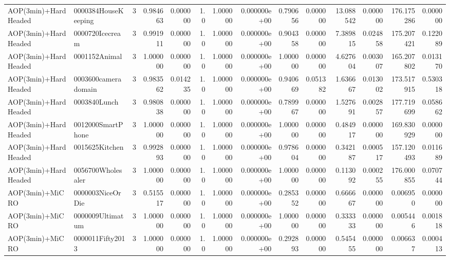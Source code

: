 \begin{tabular}{llrr|r|rr|rr|rr|rrr}
     AOP(3min)+HardHeaded &    0000384HouseKeeping &       3 & 0.984663 & 0.000000 &  1.0 &      1.000000 & 0.000000e+00 &      0.790656 & 0.000000 &     13.088542 &    0.000000 &   176.175286 &    0.000000 \\
     AOP(3min)+HardHeaded &        0000720Icecream &       3 & 0.991911 & 0.000000 &  1.0 &      1.000000 & 0.000000e+00 &      0.904358 & 0.000000 &      7.389815 &    0.024858 &   175.207421 &    0.122089 \\
     AOP(3min)+HardHeaded &          0001152Animal &       3 & 1.000000 & 0.000000 &  1.0 &      1.000000 & 0.000000e+00 &      1.000000 & 0.000000 &      4.627604 &    0.003007 &   165.207802 &    0.013170 \\
     AOP(3min)+HardHeaded &    0003600cameradomain &       3 & 0.983562 & 0.014235 &  1.0 &      1.000000 & 0.000000e+00 &      0.940669 & 0.051382 &      1.636667 &    0.013002 &   173.517915 &    0.530318 \\
     AOP(3min)+HardHeaded &           0003840Lunch &       3 & 0.980838 & 0.000000 &  1.0 &      1.000000 & 0.000000e+00 &      0.789967 & 0.000000 &      1.527691 &    0.002857 &   177.719699 &    0.058662 \\
     AOP(3min)+HardHeaded &      0012000SmartPhone &       3 & 1.000000 & 0.000000 &  1.0 &      1.000000 & 0.000000e+00 &      1.000000 & 0.000000 &      0.484917 &    0.000000 &   169.830929 &    0.000000 \\
     AOP(3min)+HardHeaded &         0015625Kitchen &       3 & 0.992893 & 0.000000 &  1.0 &      1.000000 & 0.000000e+00 &      0.978604 & 0.000000 &      0.342187 &    0.000517 &   157.120493 &    0.011689 \\
     AOP(3min)+HardHeaded &      0056700Wholesaler &       3 & 1.000000 & 0.000000 &  1.0 &      1.000000 & 0.000000e+00 &      1.000000 & 0.000000 &      0.113092 &    0.000255 &   176.000855 &    0.070744 \\
          AOP(3min)+MiCRO &       0000003NiceOrDie &       3 & 0.515517 & 0.000000 &  1.0 &      1.000000 & 0.000000e+00 &      0.285352 & 0.000000 &      0.666667 &    0.000000 &     0.006950 &    0.000000 \\
          AOP(3min)+MiCRO &       0000009Ultimatum &       3 & 1.000000 & 0.000000 &  1.0 &      1.000000 & 0.000000e+00 &      1.000000 & 0.000000 &      0.333333 &    0.000000 &     0.005446 &    0.001818 \\
          AOP(3min)+MiCRO &       0000011Fifty2013 &       3 & 1.000000 & 0.000000 &  1.0 &      1.000000 & 0.000000e+00 &      0.292893 & 0.000000 &      0.545455 &    0.000000 &     0.006637 &    0.000413 \\

\end{tabular}
